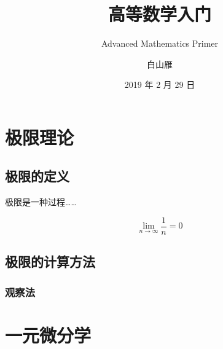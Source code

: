 \documentclass[
    b5paper,  %
    sourcefont, %
    decoration,  %
]{qyxf-book}
\title{高等数学入门}
\subtitle{Advanced Mathematics Primer}
\author{白山雁}
\date{2019 年 2 月 29 日}
\begin{document}
\maketitle

\tableofcontents

\chapter{极限理论}
\section{极限的定义}

极限是一种过程……

\[ \lim_{n\to\infty}\frac1n = 0 \]

\section{极限的计算方法}
\subsection{观察法}

\chapter{一元微分学}
\end{document}
